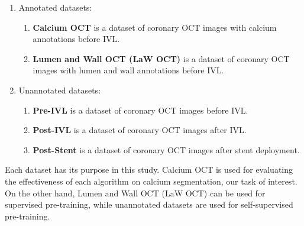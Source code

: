 \documentclass[a4paper,11pt,oneside]{report}
\begin{document}
\begin{enumerate}
    \item Annotated datasets:
    \begin{enumerate}
        \item \label{enum:calcium-dataset} \textbf{Calcium OCT} is a dataset of coronary OCT images with calcium annotations before IVL.
        \item \label{enum:lumen-and-wall-dataset} \textbf{Lumen and Wall OCT (LaW OCT)} is a dataset of coronary OCT images with lumen and wall annotations before IVL.
    \end{enumerate}
    \item \label{enum:unannotated-dataset} Unannotated datasets:
    \begin{enumerate}
        \item \textbf{Pre-IVL} is a dataset of coronary OCT images before IVL.
        \item \textbf{Post-IVL} is a dataset of coronary OCT images after IVL.
        \item \textbf{Post-Stent} is a dataset of coronary OCT images after stent deployment.
    \end{enumerate}
\end{enumerate}

Each dataset has its purpose in this study. Calcium OCT is used for evaluating the effectiveness of each algorithm on calcium segmentation, our task of interest. On the other hand, Lumen and Wall OCT (LaW OCT) can be used for supervised pre-training, while unannotated datasets are used for self-supervised pre-training. 
\end{document}
